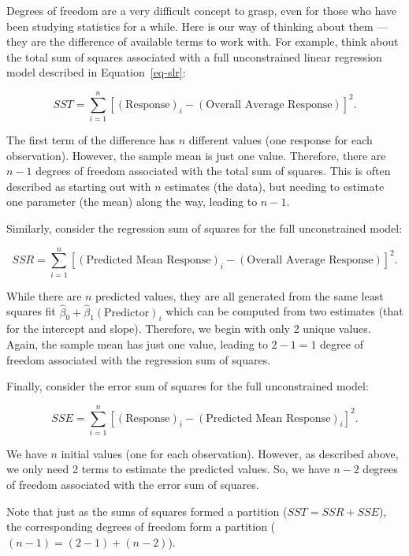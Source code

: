 \documentclass[
  letterpaper,
  DIV=11,
  numbers=noendperiod]{scrreprt}
\theoremstyle{plain}
\theoremstyle{definition}
\theoremstyle{definition}
\theoremstyle{remark}
\begin{document}
\begin{tcolorbox}[enhanced jigsaw, breakable, colback=white, arc=.35mm, coltitle=black, bottomtitle=1mm, titlerule=0mm, colbacktitle=quarto-callout-note-color!10!white, title=\textcolor{quarto-callout-note-color}{\faInfo}\hspace{0.5em}{Rationale for Degrees of Freedom}, left=2mm, opacityback=0, opacitybacktitle=0.6, colframe=quarto-callout-note-color-frame, toptitle=1mm, toprule=.15mm, rightrule=.15mm, bottomrule=.15mm, leftrule=.75mm]

Degrees of freedom are a very difficult concept to grasp, even for those
who have been studying statistics for a while. Here is our way of
thinking about them --- they are the difference of available terms to
work with. For example, think about the total sum of squares associated
with a full unconstrained linear regression model described in
Equation~\ref{eq-slr}:

\[SST = \sum_{i=1}^{n} \left[(\text{Response})_i - (\text{Overall Average Response})\right]^2.\]

The first term of the difference has \(n\) different values (one
response for each observation). However, the sample mean is just one
value. Therefore, there are \(n - 1\) degrees of freedom associated with
the total sum of squares. This is often described as starting out with
\(n\) estimates (the data), but needing to estimate one parameter (the
mean) along the way, leading to \(n - 1\).

Similarly, consider the regression sum of squares for the full
unconstrained model:

\[SSR = \sum_{i=1}^{n} \left[(\text{Predicted Mean Response})_i - (\text{Overall Average Response})\right]^2.\]

While there are \(n\) predicted values, they are all generated from the
same least squares fit
\(\widehat{\beta}_0 + \widehat{\beta}_1 (\text{Predictor})_i\) which can
be computed from two estimates (that for the intercept and slope).
Therefore, we begin with only 2 unique values. Again, the sample mean
has just one value, leading to \(2 - 1 = 1\) degree of freedom
associated with the regression sum of squares.

Finally, consider the error sum of squares for the full unconstrained
model:

\[SSE = \sum_{i=1}^{n} \left[(\text{Response})_i - (\text{Predicted Mean Response})_i\right]^2.\]

We have \(n\) initial values (one for each observation). However, as
described above, we only need 2 terms to estimate the predicted values.
So, we have \(n - 2\) degrees of freedom associated with the error sum
of squares.

Note that just as the sums of squares formed a partition
(\(SST = SSR + SSE\)), the corresponding degrees of freedom form a
partition (\((n - 1) = (2 - 1) + (n - 2)\)).

\end{tcolorbox}
\end{document}
